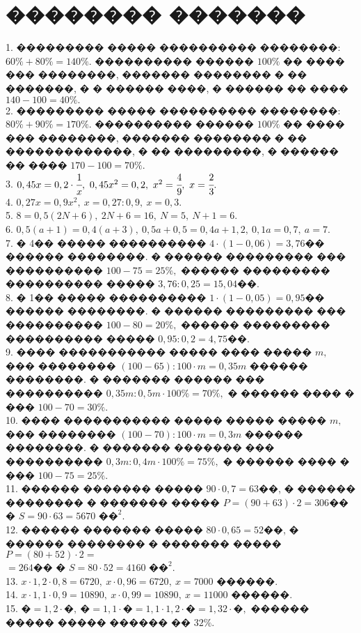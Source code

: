 \documentclass[12pt]{article}
\begin{document}
\section{�������� �������}
1. ��������� ����� ���������� ��������: $60\%+80\%=140\%.$ ���������� ������ $100\%$ �� ���� ��� ��������, ������� �������� � �� �������, � � ������ ����, � ������ �� ���� $140-100=40\%.$\\
2. ��������� ����� ���������� ��������: $80\%+90\%=170\%.$ ���������� ������ $100\%$ �� ���� ��� ��������, ������� �������� � �� �������������, � �� ���������, � ������ �� ���� $170-100=70\%.$\\
3. $0,45x=0,2\cdot\cfrac{1}{x},\ 0,45x^2=0,2,\ x^2=\cfrac{4}{9},\ x=\cfrac{2}{3}.$\\
4. $0,27x=0,9x^2,\ x=0,27:0,9,\ x=0,3.$\\
5. $8=0,5(2N+6),\ 2N+6=16,\ N=5,\ N+1=6.$\\
6. $0,5(a+1)=0,4(a+3),\ 0,5a+0,5=0,4a+1,2,\ 0,1a=0,7,\ a=7.$\\
7. � 4�� ����� ���������� $4\cdot(1-0,06)=3,76$�� ������ ��������. � ������ ��������� ��� ���������� $100-75=25\%,$ ������ ��������� ���������� ����� $3,76:0,25=15,04$��.\\
8. � 1�� ����� ���������� $1\cdot(1-0,05)=0,95$�� ������ ��������. � ������ ��������� ��� ���������� $100-80=20\%,$ ������ ��������� ���������� ����� $0,95:0,2=4,75$��.\\
9. ���� ����������� ����� ���� ����� $m,$ ��� �������� $(100-65):100\cdot m=0,35m$ ������ ��������. � ������� ������ ��� ���������� $0,35m:0,5m\cdot100\%=70\%,$ � ������ ���� � ��� $100-70=30\%.$\\
10. ���� ����������� ����� ����� ����� $m,$ ��� �������� $(100-70):100\cdot m=0,3m$ ������ ��������. � ������� ������� ��� ���������� $0,3m:0,4m\cdot100\%=75\%,$ � ������ ���� � ��� $100-75=25\%.$\\
11. ������ ������� ����� $90\cdot0,7=63$��, � ������ �������� � ������� ����� $P=(90+63)\cdot2=306$�� � $S=90\cdot63=5670\text{ ��}^2.$\\
12. ������ ������� ����� $80\cdot0,65=52$��, � ������ �������� � ������� ����� $P=(80+52)\cdot2=$\\$=264$�� � $S=80\cdot52=4160\text{ ��}^2.$\\
13. $x\cdot1,2\cdot0,8=6720,\ x\cdot0,96=6720,\ x=7000$ ������.\\
14. $x\cdot1,1\cdot0,9=10890,\ x\cdot0,99=10890,\ x=11000$ ������.\\
15. $\text{�}=1,2\cdot\text{�},\ \text{�}=1,1\cdot\text{�}=1,1\cdot1,2\cdot\text{�}=1,32\cdot\text{�},$ ������ ����� ����� ������ �� $32\%.$\\
\end{document}
